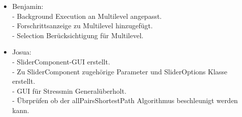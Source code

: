 \documentclass[]{article}
\begin{document}
\begin{itemize}
		\item Benjamin: \\

	- Background Execution an Multilevel angepasst.\\
	- Forschrittsanzeige zu Multilevel hinzugefügt.\\
	- Selection Berücksichtigung für Multilevel.\pagebreak
		\item Josua: \\

	- SliderComponent-GUI erstellt.\\
	- Zu SliderComponent zugehörige Parameter und SliderOptions Klasse erstellt.\\
	- GUI für Stressmin Generalüberholt.\\
	- Übrprüfen ob der allPairsShortestPath Algorithmus beschleunigt werden kann.\\
		
	\end{itemize} 
	
\end{document}
